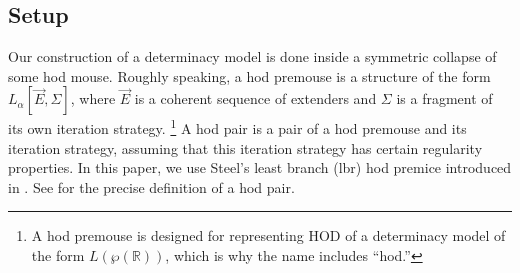 \documentclass{amsart}
\newcommand{\power}{\wp}
\begin{document}
\subsection{Setup}

Our construction of a determinacy model is done inside a symmetric collapse of some hod mouse.
Roughly speaking, a hod premouse is a structure of the form $L_{\alpha}[\vec{E}, \Sigma]$, where $\vec{E}$ is a coherent sequence of extenders and $\Sigma$ is a fragment of its own iteration strategy.
\footnote{A hod premouse is designed for representing $\mathrm{HOD}$ of a determinacy model of the form $L(\power(\mathbb{R}))$, which is why the name includes ``hod.''}
A hod pair is a pair of a hod premouse and its iteration strategy, assuming that this iteration strategy has certain regularity properties.
In this paper, we use Steel's least branch (lbr) hod premice introduced in \cite{CPMP}.
See \cite[Definition 9.2.2]{CPMP} for the precise definition of a hod pair.
\end{document}
